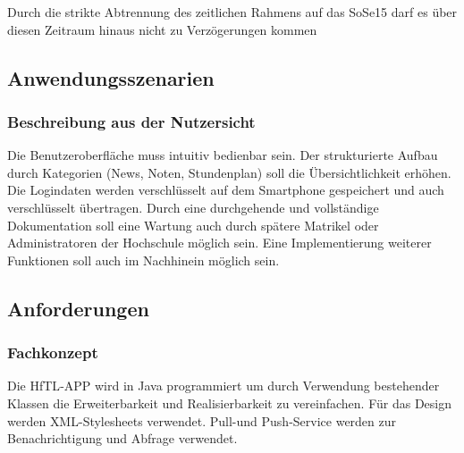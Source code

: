 Durch die strikte Abtrennung des zeitlichen Rahmens auf das \acs{SoSe15} darf es über diesen Zeitraum hinaus nicht zu Verzögerungen kommen

\subsection{Anwendungsszenarien}

\subsubsection{\textbf{Beschreibung aus der Nutzersicht}}

Die Benutzeroberfläche muss intuitiv bedienbar sein. Der strukturierte Aufbau durch Kategorien (News, Noten, Stundenplan) soll die Übersichtlichkeit erhöhen.
Die Logindaten werden verschlüsselt auf dem Smartphone gespeichert und auch verschlüsselt übertragen.
Durch eine durchgehende und vollständige Dokumentation soll eine Wartung auch durch spätere Matrikel oder Administratoren der Hochschule möglich sein.
Eine Implementierung weiterer Funktionen soll auch im Nachhinein möglich sein.

\subsection{Anforderungen}

\subsubsection{\textbf{Fachkonzept}}
Die \acs{HfTL}-APP  wird in Java programmiert um durch Verwendung bestehender Klassen die Erweiterbarkeit und Realisierbarkeit zu vereinfachen. Für das Design werden \acs{XML}-Stylesheets verwendet.
Pull-und Push-Service werden zur Benachrichtigung und Abfrage verwendet.




$\;$ \\ %


